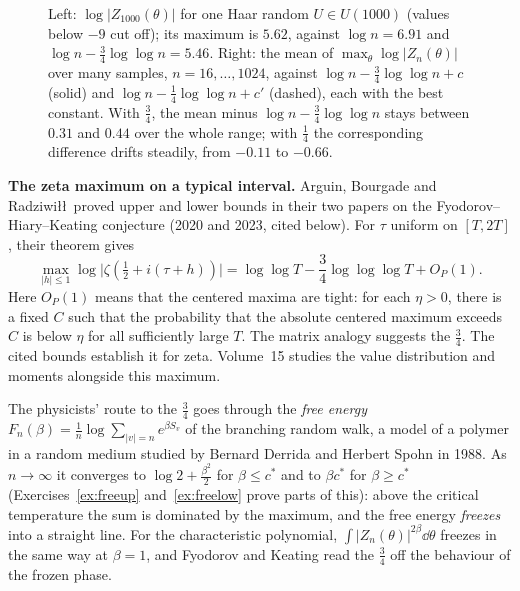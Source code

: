 \begin{figure}[ht]
\centering
{}
\caption{Left: $\log|Z_{1000}(\theta)|$ for one Haar random $U\in U(1000)$ (values below $-9$ cut off); its maximum is $5.62$, against $\log n=6.91$ and $\log n-\frac34\log\log n=5.46$. Right: the mean of $\max_\theta\log|Z_n(\theta)|$ over many
samples, $n=16,\dots,1024$, against $\log n-\frac34\log\log n+c$ (solid) and $\log n-\frac14\log\log n+c'$ (dashed), each with the best constant. With $\frac34$, the mean minus $\log n-\frac34\log\log n$ stays between $0.31$ and $0.44$ over the whole range; with $\frac14$ the corresponding difference drifts steadily, from $-0.11$ to $-0.66$.}
\label{fig:maxima}
\end{figure}

\begin{beauty}
\textbf{The zeta maximum on a typical interval.} Arguin, Bourgade and Radziwi\l\l\ proved upper and lower bounds in their two papers on the Fyodorov--Hiary--Keating conjecture (2020 and 2023, cited below). For $\tau$ uniform on $[T,2T]$, their theorem gives
\[
\max_{|h|\le1}\log\bigl|\zeta(\tfrac12+i(\tau+h))\bigr|
=\log\log T-\frac34\log\log\log T+O_P(1).
\]
Here $O_P(1)$ means that the centered maxima are tight: for each $\eta>0$, there is a fixed $C$ such that the probability that the absolute centered maximum exceeds $C$ is below $\eta$ for all sufficiently large $T$. The matrix analogy suggests the $\frac34$. The cited bounds establish it for zeta. Volume~15 studies the value distribution and moments alongside this maximum.
\end{beauty}

\begin{remark}[freezing]
The physicists' route to the $\frac34$ goes through the \emph{free energy} $F_n(\beta)=\frac1n\log\sum_{|v|=n}e^{\beta S_v}$ of the branching random walk, a model of a polymer in a random medium studied by Bernard Derrida and Herbert
Spohn in 1988. As $n\to\infty$ it converges to $\log2+\frac{\beta^2}2$ for $\beta\le c^*$ and to $\beta c^*$ for $\beta\ge c^*$ (Exercises~\ref{ex:freeup} and~\ref{ex:freelow} prove parts of this): above the critical temperature the sum is dominated by
the maximum, and the free energy \emph{freezes} into a straight line. For the characteristic polynomial, $\int|Z_n(\theta)|^{2\beta}\dd\theta$ freezes in the same way at $\beta=1$, and Fyodorov and Keating read the $\frac34$ off the
behaviour of the frozen phase.
\end{remark}




